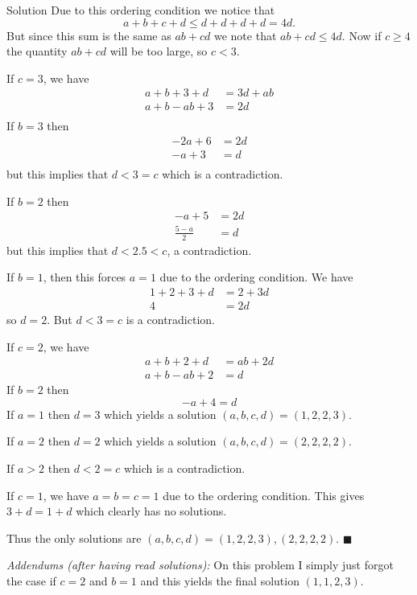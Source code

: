 \documentclass{article}
\begin{document}
\begin{solution}{Solution}
Due to this ordering condition we notice that
$$
a+b+c+d \leq d+d+d+d = 4d.
$$
But since this sum is the same as $ab+cd$ we note that
$ab+cd \leq 4d$. Now if $c \geq 4$ the quantity $ab+cd$ will be too large,
so $c < 3$. \vspace{0.2cm}

If $c = 3$, we have
\[
\begin{aligned}
a + b + 3 + d &= 3d + ab \\
a + b - ab + 3 &= 2d \\
\end{aligned}
\]
If $b = 3$ then
\[
\begin{aligned}
-2a + 6 &= 2d \\
-a + 3 &= d \\
\end{aligned}
\]
but this implies that $d < 3 = c$ which is a contradiction.
\vspace{0.2cm}

If $b = 2$ then
\[
\begin{aligned}
-a + 5 &= 2d \\
\frac{5-a}{2} &= d
\end{aligned}
\]
but this implies that $d < 2.5 < c$, a contradiction.
\vspace{0.2cm}

If $b = 1$, then this forces $a=1$ due to the ordering condition.
We have
\[
\begin{aligned}
1 + 2 + 3 + d &= 2 + 3d \\
4 &= 2d
\end{aligned}
\]
so $d=2$. But $d < 3 = c$ is a contradiction.
\vspace{0.2cm}

If $c = 2$, we have
\[
\begin{aligned}
a + b + 2 + d &= ab + 2d \\
a + b - ab + 2 &= d
\end{aligned}
\]
If $b = 2$ then
$$
-a + 4 = d
$$
If $a = 1$ then $d = 3$ which yields a solution
$(a,b,c,d) = (1,2,2,3)$. \vspace{0.2cm}

If $a = 2$ then $d = 2$ which yields a solution
$(a,b,c,d) = (2,2,2,2)$. \vspace{0.2cm}

If $a > 2$ then $d < 2 = c$ which is a contradiction.
\vspace{0.2cm}

If $c = 1$, we have $a=b=c=1$ due to the ordering condition. This gives
$3 + d = 1 + d$ which clearly has no solutions. \vspace{0.2cm}

Thus the only solutions are $(a,b,c,d) = (1,2,2,3), (2,2,2,2)$.
$\blacksquare$
\\

\hline
\vspace{0.2cm}

\textit{Addendums (after having read solutions):} On this problem I simply
just forgot the case if $c=2$ and $b=1$ and this yields the final solution
$(1,1,2,3)$.
\end{solution}
\newpage
\end{document}
